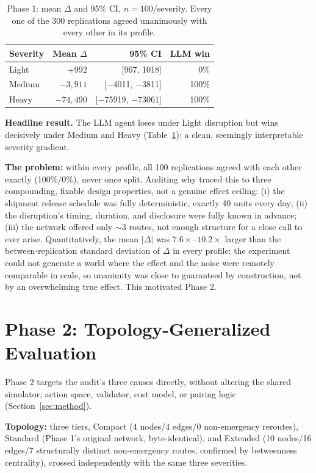 \documentclass[10pt,twocolumn]{article}
\begin{document}
\begin{table}[t]
\centering
\small
\begin{tabular}{@{}lrrr@{}}
\toprule
Severity & Mean $\Delta$ & 95\% CI & LLM win \\
\midrule
Light  & $+992$ & [967, 1018] & 0\% \\
Medium & $-3{,}911$ & [$-$4011, $-$3811] & 100\% \\
Heavy  & $-74{,}490$ & [$-$75919, $-$73061] & 100\% \\
\bottomrule
\end{tabular}
\caption{Phase 1: mean $\Delta$ and 95\% CI, $n=100$/severity. Every one of the 300 replications agreed unanimously with every other in its profile.}
\label{tab:v1}
\end{table}

\textbf{Headline result.} The LLM agent loses under Light disruption but wins decisively under Medium and Heavy (Table~\ref{tab:v1}): a clean, seemingly interpretable severity gradient.

\textbf{The problem:} within every profile, all 100 replications agreed with each other exactly (100\%/0\%), never once split. Auditing why traced this to three compounding, fixable design properties, not a genuine effect ceiling: (i) the shipment release schedule was fully deterministic, exactly 40 units every day; (ii) the disruption's timing, duration, and disclosure were fully known in advance; (iii) the network offered only $\sim$3 routes, not enough structure for a close call to ever arise. Quantitatively, the mean $|\Delta|$ was $7.6\times$--$10.2\times$ larger than the between-replication standard deviation of $\Delta$ in every profile: the experiment could not generate a world where the effect and the noise were remotely comparable in scale, so unanimity was close to guaranteed by construction, not by an overwhelming true effect. This motivated Phase 2.

\section{Phase 2: Topology-Generalized Evaluation}
\label{sec:phase2}
Phase 2 targets the audit's three causes directly, without altering the shared simulator, action space, validator, cost model, or pairing logic (Section~\ref{sec:method}).

\textbf{Topology:} three tiers, Compact (4 nodes/4 edges/0 non-emergency reroutes), Standard (Phase 1's original network, byte-identical), and Extended (10 nodes/16 edges/7 structurally distinct non-emergency routes, confirmed by betweenness centrality), crossed independently with the same three severities.
\end{document}
